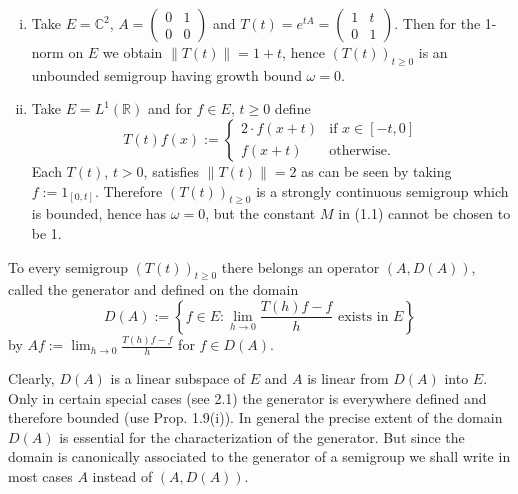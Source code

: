 \begin{example}
\begin{enumerate}[(i)]
\item
Take $E = \mathbb{C}^{2}$, $A = \begin{pmatrix} 0 & 1 \\ 0 & 0 \end{pmatrix}$ and $T(t) = e^{tA} = \begin{pmatrix} 1 & t \\ 0 & 1 \end{pmatrix}$.
Then for the 1-norm on $E$ we obtain $\|T(t)\| = 1 + t$, hence $(T(t))_{t \geq 0}$ is an unbounded semigroup having growth bound $\omega = 0$.

\item
Take $E = L^{1}(\mathbb{R})$ and for $f \in E$, $t \geq 0$ define
\[
T(t)f(x) := \begin{cases}
2 \cdot f(x+t) & \text{if } x \in [-t,0] \\
f(x+t) & \text{otherwise.}
\end{cases}
\]
Each $T(t)$, $t > 0$, satisfies $\|T(t)\| = 2$ as can be seen by taking $f := 1_{[0,t]}$.
Therefore $(T(t))_{t \geq 0}$ is a strongly continuous semigroup which is bounded, hence has $\omega = 0$, but the constant $M$ in (1.1) cannot be chosen to be 1.

\end{enumerate}
\end{example}
\begin{definition}
To every semigroup $(T(t))_{t \geq 0}$ there belongs an operator $(A,D(A))$, called the generator and defined on the domain
\[
D(A) := \left\{f \in E: \lim_{h \to 0} \frac{T(h)f-f}{h} \text{ exists in } E\right\}
\]
by $Af := \lim_{h \to 0} \frac{T(h)f-f}{h}$ for $f \in D(A)$.
\end{definition}
Clearly, $D(A)$ is a linear subspace of $E$ and $A$ is linear from $D(A)$ into $E$.
Only in certain special cases (see 2.1) the generator is everywhere defined and therefore bounded (use Prop. 1.9(i)).
In general the precise extent of the domain $D(A)$ is essential for the characterization of the generator.
But since the domain is canonically associated to the generator of a semigroup we shall write in most cases $A$ instead of $(A,D(A))$.
